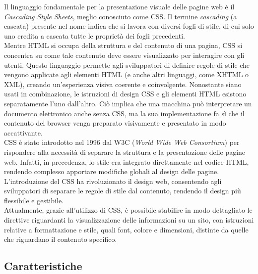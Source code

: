 Il linguaggio fondamentale per la presentazione visuale delle pagine web è il \textit{Cascading Style Sheets}, meglio conosciuto come CSS. Il termine \textit{cascading} (a cascata) presente nel nome indica che si lavora con diversi fogli di stile, di cui solo uno eredita a cascata tutte le proprietà dei fogli precedenti.\cite{CSS_dmep}\\
Mentre HTML si occupa della struttura e del contenuto di una pagina, CSS si concentra su come tale contenuto deve essere visualizzato per interagire con gli utenti. Questo linguaggio permette agli sviluppatori di definire regole di stile che vengono applicate agli elementi HTML (e anche altri linguaggi, come XHTML o XML\cite{CSS_wikipedia}), creando un’esperienza visiva coerente e coinvolgente. Nonostante siano usati in combinazione, le istruzioni di design CSS e gli elementi HTML esistono separatamente l’uno dall’altro. Ciò implica che una macchina può interpretare un documento elettronico anche senza CSS, ma la sua implementazione fa sì che il contenuto del browser venga preparato visivamente e presentato in modo accattivante.\\
CSS è stato introdotto nel 1996 dal W3C (\textit{World Wide Web Consortium}) per rispondere alla necessità di separare la struttura e la presentazione delle pagine web. Infatti, in precedenza, lo stile era integrato direttamente nel codice HTML, rendendo complesso apportare modifiche globali al design delle pagine. L’introduzione del CSS ha rivoluzionato il design web, consentendo agli sviluppatori di separare le regole di stile dal contenuto, rendendo il design più flessibile e gestibile.\cite{CSS_creativemotions}\\
Attualmente, grazie all’utilizzo di CSS, è possibile stabilire in modo dettagliato le direttive riguardanti la visualizzazione delle informazioni su un sito, con istruzioni relative a formattazione e stile, quali font, colore e dimensioni, distinte da quelle che riguardano il contenuto specifico.

\subsection{Caratteristiche}

